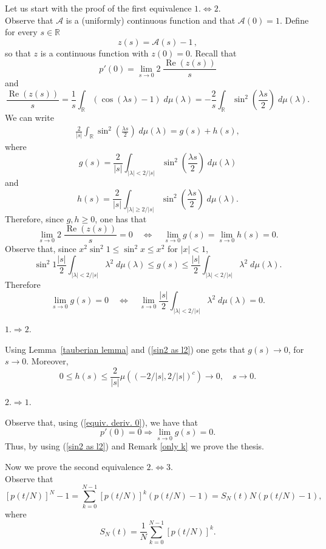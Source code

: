 \documentclass[aip,jmp,12pt
]{revtex4}
\renewcommand{\Re}{\mathop{\mathrm{Re}}\nolimits}
\newcommand{\RM}{\mathbb{R}}
\theoremstyle{definition}
\begin{document}
Let us start with the proof of the first equivalence $1. \Leftrightarrow 2.$\\
Observe that $\mathcal{A}$ is a (uniformly) continuous function and that $\mathcal{A}(0)=1$. Define for every $s \in \RM$
$$
z(s)=\mathcal{A}(s)-1\,,
$$
so that $z$ is a continuous function with $z(0)=0$.
Recall that
\begin{equation}\label{rel dA e dp}
p'(0)=\lim_{s \to 0} 2 \; \frac{\Re (z(s))}{s}
\end{equation}
and
$$
\frac{\Re (z(s))}{s} =\frac{1}{s} \int_{\RM} \left(\cos(\lambda s)-1\right)\; d\mu(\lambda)=-\frac{2}{s} \int_{\RM} \sin^2 \left(\frac{\lambda s}{2}\right) \; d\mu(\lambda) .
$$
We can write
\begin{eqnarray*}
\frac{2}{|s|} \int_{\RM} \sin^2 \left(\frac{\lambda s}{2}\right)\; d\mu(\lambda)
= g(s)+h(s) ,
\end{eqnarray*}
where
$$
g(s)=\frac{2}{|s|} \int_{|\lambda|<2/|s|} \sin^2 \left(\frac{\lambda s}{2}\right) \; d\mu(\lambda)
$$
and
$$
h(s)=\frac{2}{|s|} \int_{|\lambda|\geq 2/|s|} \sin^2 \left(\frac{\lambda s}{2}\right)\; d\mu(\lambda) .
$$
Therefore, since $g,h \geq 0$, one has that
\begin{equation}\label{equiv. deriv. 0}
\lim_{s \to 0} 2 \;\frac{\Re (z(s))}{s}=0 \quad \Leftrightarrow \quad \lim_{s \to 0} g(s)=\lim_{s \to 0} h(s)=0.
\end{equation}
Observe that, since $x^2 \sin^2 1 \leq \sin^2 x \leq x^2$ for $|x|<1$,
$$
\sin^2 1 \frac{|s|}{2} \int_{|\lambda|< 2/|s|} \lambda^2 \;d\mu(\lambda) \leq g(s) \leq \frac{|s|}{2} \int_{|\lambda|< 2/|s|}\lambda^2 \;d\mu(\lambda) .
$$
Therefore
\begin{equation}\label{sin2 as l2}
\lim_{s \to 0} g(s) = 0 \quad \Leftrightarrow \quad  \lim_{s \to 0} \frac{|s|}{2} \int_{|\lambda|< 2/|s|} \lambda^2 \;d\mu(\lambda)=0 .
\end{equation}

$1. \Rightarrow 2.$

Using Lemma~\ref{tauberian lemma} and (\ref{sin2 as l2}) one gets that $g(s) \to 0$, for $s \to 0$. Moreover,
$$
0 \leq h(s) \leq \frac{2}{|s|}\mu\left((-2/|s|,2/|s|)^c\right)\to 0, \quad s\to 0.
$$

$2. \Rightarrow 1.$

Observe that, using (\ref{equiv. deriv. 0}), we have that
$$
p'(0)=0 \Rightarrow \lim_{s \to 0} g(s)=0.
$$
Thus, by using (\ref{sin2 as l2}) and Remark \ref{only k} we prove the thesis.

Now we prove the second equivalence $2. \Leftrightarrow 3.$\\
Observe that
\begin{equation}
\label{eq:pvsS}
[p(t/N)]^N -1  =  \sum_{k=0}^{N-1}[p(t/N)]^k \left(p(t/N)-1\right)= S_{N}(t)N\left(p(t/N)-1\right),
\end{equation}
where
$$
S_{N}(t)= \frac{1}{N}\sum_{k=0}^{N-1}[p(t/N)]^k.
$$
\end{document}

